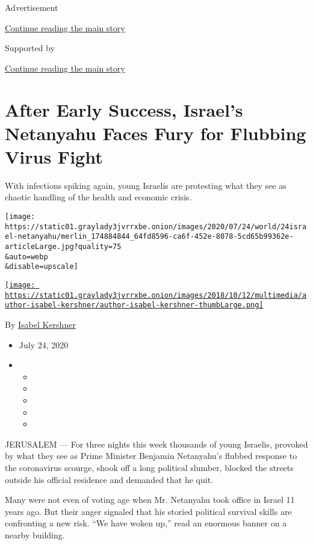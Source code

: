 Advertisement

\protect\hyperlink{after-top}{Continue reading the main story}

Supported by

\protect\hyperlink{after-sponsor}{Continue reading the main story}

\hypertarget{after-early-success-israels-netanyahu-faces-fury-for-flubbing-virus-fight}{%
\section{After Early Success, Israel's Netanyahu Faces Fury for Flubbing
Virus
Fight}\label{after-early-success-israels-netanyahu-faces-fury-for-flubbing-virus-fight}}

With infections spiking again, young Israelis are protesting what they
see as chaotic handling of the health and economic crisis.

\texttt{[image: https://static01.graylady3jvrrxbe.onion/images/2020/07/24/world/24israel-netanyahu/merlin\_174884844\_64fd8596-ca6f-452e-8078-5cd65b99362e-articleLarge.jpg?quality=75\\\&auto=webp\\\&disable=upscale]}

\href{https://www.nytimes3xbfgragh.onion/by/isabel-kershner}{\texttt{[image: https://static01.graylady3jvrrxbe.onion/images/2018/10/12/multimedia/author-isabel-kershner/author-isabel-kershner-thumbLarge.png]}}

By \href{https://www.nytimes3xbfgragh.onion/by/isabel-kershner}{Isabel
Kershner}

\begin{itemize}
\item
  July 24, 2020
\item
  \begin{itemize}
  \item
  \item
  \item
  \item
  \item
  \end{itemize}
\end{itemize}

JERUSALEM --- For three nights this week thousands of young Israelis,
provoked by what they see as Prime Minister Benjamin Netanyahu's flubbed
response to the coronavirus scourge, shook off a long political slumber,
blocked the streets outside his official residence and demanded that he
quit.

Many were not even of voting age when Mr. Netanyahu took office in
Israel 11 years ago. But their anger signaled that his storied political
survival skills are confronting a new risk. ``We have woken up,'' read
an enormous banner on a nearby building.

